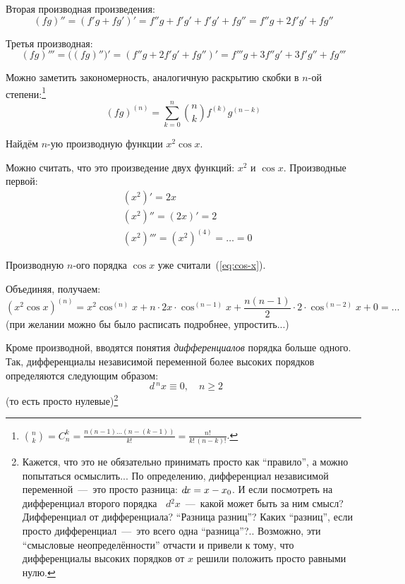 \documentclass[a4paper,12pt]{article}
\newcommand{\diff}{\mathop{}\!d\!}
\begin{document}
  Вторая производная произведения:
  \[
     (fg)'' = (f' g + f g')' = f''g + f'g' + f'g' + fg'' = f''g + 2f'g' + fg''
  \]

  Третья производная:
  \[
    (fg)''' = \bigl((fg)''\bigr)' = (f''g + 2f'g' + fg'')' = f'''g + 3 f''g' + 3f'g'' + fg'''
  \]

  Можно заметить закономерность, аналогичную раскрытию скобки в $n$-ой степени:\footnote{
    $\binom{n}{k} = C_n^k = \frac{n(n - 1)\ldots (n - (k - 1))}{k!} = \frac{n!}{k!\, (n - k)!}$.
  }
  \begin{equation}\label{eq:diff-fg-n}
    (fg)^{(n)} = \sum_{k = 0}^n \binom{n}{k} f^{(k)} g^{(n - k)}
  \end{equation}

  \begin{example}
    Найдём $n$-ую производную функции $x^2 \cos x$.

    Можно считать, что это произведение двух функций: $x^2$ и $\cos x$.
    Производные первой:
    \[
      \begin{aligned}
        &\left(x^2\right)' = 2 x\\
        &\left(x^2\right)'' = (2 x)' = 2\\
        &\left(x^2\right)''' = \left(x^2\right)^{(4)} = \ldots = 0
      \end{aligned}
    \]

    Производную $n$-ого порядка $\cos x$ уже считали~(\ref{eq:cos-x}).

    Объединяя, получаем:
    \[
      \left(x^2 \cos x\right)^{(n)}
        = x^2 \cos^{(n)} x + n \cdot 2x \cdot \cos^{(n - 1)} x + \frac{n(n - 1)}{2} \cdot 2 \cdot \cos^{(n - 2)} x + 0
        = \ldots
    \]
    (при желании можно бы было расписать подробнее, упростить...)
  \end{example}


  Кроме производной, вводятся понятия \emph{дифференциалов} порядка больше одного.
  Так, дифференциалы независимой переменной более высоких порядков определяются следующим образом:
  \[
    \diff\,^n x \equiv 0,\quad n \geq 2
  \]
  (то есть просто нулевые)\footnote{
    Кажется, что это не обязательно принимать просто как ``правило'', а можно попытаться осмыслить...
    По определению, дифференциал независимой переменной~---~это просто разница: $\diff x \hm= x \hm- x_0$.
    И если посмотреть на дифференциал второго порядка $\diff^2 x$~---~какой может быть за ним смысл?
    Дифференциал от дифференциала?
    ``Разница разниц''?
    Каких ``разниц'', если просто дифференциал~---~это всего одна ``разница''?..
    Возможно, эти ``смысловые неопределённости'' отчасти и привели к тому, что дифференциалы высоких порядков от $x$ решили положить просто равными нулю.
  }
\end{document}
